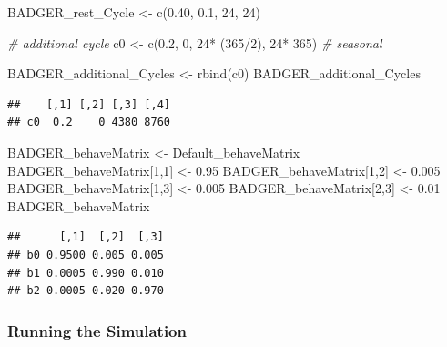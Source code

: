 \documentclass[10pt,a4paper]{article}
\newenvironment{Shaded}{}{}
\newcommand{\CommentTok}[1]{\textit{#1}}
\newcommand{\DecValTok}[1]{#1}
\newcommand{\FloatTok}[1]{#1}
\newcommand{\FunctionTok}[1]{#1}
\newcommand{\NormalTok}[1]{#1}
\newcommand{\OtherTok}[1]{#1}
\newcommand{\SpecialCharTok}[1]{#1}
\begin{document}
\begin{Shaded}
\begin{Highlighting}[]
\NormalTok{BADGER\_rest\_Cycle }\OtherTok{\textless{}{-}} \FunctionTok{c}\NormalTok{(}\FloatTok{0.40}\NormalTok{, }\FloatTok{0.1}\NormalTok{, }\DecValTok{24}\NormalTok{, }\DecValTok{24}\NormalTok{)}

\CommentTok{\# additional cycle}
\NormalTok{c0 }\OtherTok{\textless{}{-}} \FunctionTok{c}\NormalTok{(}\FloatTok{0.2}\NormalTok{, }\DecValTok{0}\NormalTok{, }\DecValTok{24}\SpecialCharTok{*}\NormalTok{ (}\DecValTok{365}\SpecialCharTok{/}\DecValTok{2}\NormalTok{), }\DecValTok{24}\SpecialCharTok{*} \DecValTok{365}\NormalTok{) }\CommentTok{\# seasonal}

\NormalTok{BADGER\_additional\_Cycles }\OtherTok{\textless{}{-}} \FunctionTok{rbind}\NormalTok{(c0)}
\NormalTok{BADGER\_additional\_Cycles}
\end{Highlighting}
\end{Shaded}

\begin{verbatim}
##    [,1] [,2] [,3] [,4]
## c0  0.2    0 4380 8760
\end{verbatim}

\begin{Shaded}
\begin{Highlighting}[]
\NormalTok{BADGER\_behaveMatrix }\OtherTok{\textless{}{-}}\NormalTok{ Default\_behaveMatrix}
\NormalTok{BADGER\_behaveMatrix[}\DecValTok{1}\NormalTok{,}\DecValTok{1}\NormalTok{] }\OtherTok{\textless{}{-}} \FloatTok{0.95}
\NormalTok{BADGER\_behaveMatrix[}\DecValTok{1}\NormalTok{,}\DecValTok{2}\NormalTok{] }\OtherTok{\textless{}{-}} \FloatTok{0.005}
\NormalTok{BADGER\_behaveMatrix[}\DecValTok{1}\NormalTok{,}\DecValTok{3}\NormalTok{] }\OtherTok{\textless{}{-}} \FloatTok{0.005}
\NormalTok{BADGER\_behaveMatrix[}\DecValTok{2}\NormalTok{,}\DecValTok{3}\NormalTok{] }\OtherTok{\textless{}{-}} \FloatTok{0.01}
\NormalTok{BADGER\_behaveMatrix}
\end{Highlighting}
\end{Shaded}

\begin{verbatim}
##      [,1]  [,2]  [,3]
## b0 0.9500 0.005 0.005
## b1 0.0005 0.990 0.010
## b2 0.0005 0.020 0.970
\end{verbatim}

\hypertarget{running-the-simulation}{%
\subsubsection{Running the Simulation}\label{running-the-simulation}}
\end{document}
